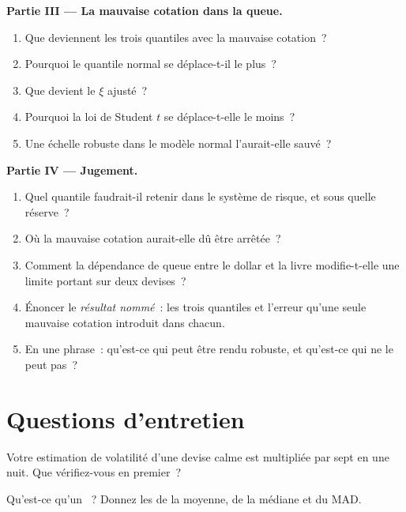 \begin{problem}
\medskip\noindent\textbf{Partie III --- La mauvaise cotation dans la queue.}
\begin{enumerate}[resume]
\item Que deviennent les trois quantiles avec la mauvaise cotation~?
\item Pourquoi le quantile normal se déplace-t-il le plus~?
\item Que devient le $\xi$ ajusté~?
\item Pourquoi la loi de Student $t$ se déplace-t-elle le moins~?
\item Une échelle robuste dans le modèle normal l'aurait-elle sauvé~?
\end{enumerate}

\medskip\noindent\textbf{Partie IV --- Jugement.}
\begin{enumerate}[resume]
\item Quel quantile faudrait-il retenir dans le système de risque, et sous quelle réserve~?
\item Où la mauvaise cotation aurait-elle dû être arrêtée~?
\item Comment la dépendance de queue entre le dollar et la livre modifie-t-elle une limite portant sur deux devises~?
\item Énoncer le \emph{résultat nommé}~: les trois quantiles et l'erreur qu'une seule mauvaise cotation introduit dans chacun.
\item En une phrase~: qu'est-ce qui peut être rendu robuste, et qu'est-ce qui ne le peut pas~?
\end{enumerate}
\end{problem}

\section{Questions d'entretien}

\begin{interviewq}\label{iq:qm:robust-statistics-and-heavy-tails:1}
Votre estimation de volatilité d'une devise calme est multipliée par sept en une nuit. Que vérifiez-vous en premier~?
\end{interviewq}

\begin{interviewq}\label{iq:qm:robust-statistics-and-heavy-tails:2}
Qu'est-ce qu'un ~? Donnez les  de la moyenne, de la médiane et du MAD.
\end{interviewq}

